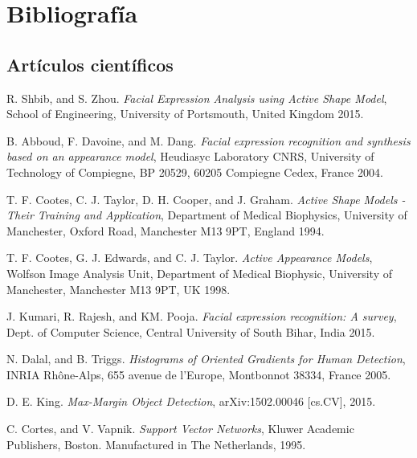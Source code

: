 \documentclass[a4paper,11pt]{book}
\begin{document}
\chapter{Bibliografía}
\begin{thebibliography}{99}
	\section{Artículos científicos}
	R. Shbib, and S. Zhou. %
	\textit{Facial Expression Analysis using Active Shape Model}, %
	School of Engineering, University of Portsmouth, United Kingdom	%
	2015.	%
	
	B. Abboud, F. Davoine, and M. Dang. %
	\textit{Facial expression recognition and synthesis based on
		an appearance model}, %
	Heudiasyc Laboratory CNRS, University of Technology of Compiegne, BP 20529, 60205 Compiegne Cedex, France	%
	2004.	%
	
	T. F. Cootes, C. J. Taylor, D. H. Cooper, and J. Graham. %
	\textit{Active Shape Models - Their Training and Application}, %
	Department of Medical Biophysics, University of Manchester, Oxford Road, Manchester M13 9PT, England 	%
	1994.	%
	
	T. F. Cootes, G. J. Edwards, and C. J. Taylor. %
	\textit{Active Appearance Models}, %
	Wolfson Image Analysis Unit, Department of Medical Biophysic, University of Manchester, Manchester M13 9PT, UK %
	1998.	%
	
	J. Kumari, R. Rajesh, and KM. Pooja. %
	\textit{Facial expression recognition: A survey}, %
	Dept. of Computer Science, Central University of South Bihar, India 
	2015.	%
	
	N. Dalal, and B. Triggs. %
	\textit{Histograms of Oriented Gradients for Human Detection}, %
	INRIA Rhône-Alps, 655 avenue de l’Europe, Montbonnot 38334, France
	2005.	%
	
	D. E. King.
	\textit{Max-Margin Object Detection}, %
	arXiv:1502.00046 [cs.CV],
	2015.	%
	
	C. Cortes, and V. Vapnik. %
	\textit{Support Vector Networks}, %
	Kluwer Academic Publishers, Boston. Manufactured in The Netherlands,
	1995.	%
	

\end{thebibliography}
\end{document}
